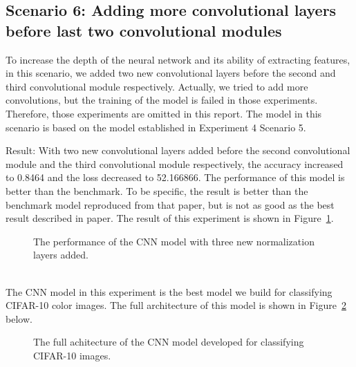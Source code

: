 \documentclass[]{UCD_CS_FYP_Report}
\begin{document}
\subsection{Scenario 6: Adding more convolutional layers before last two convolutional modules}
To increase the depth of the neural network and its ability of extracting features, in this scenario, we added two new convolutional layers before the second and third convolutional module respectively. Actually, we tried to add more convolutions, but the training of the model is failed in those experiments. Therefore, those experiments are omitted in this report. The model in this scenario is based on the model established in Experiment 4 Scenario 5.

Result: With two new convolutional layers added before the second convolutional module and the third convolutional module respectively, the accuracy increased to 0.8464 and the loss decreased to 52.166866. The performance of this model is better than the benchmark. To be specific, the result is better than the benchmark model reproduced from that paper, but is not as good as the best result described in paper. The result of this experiment is shown in Figure~\ref{fig:CIFAR_10_CNN_S6E1}.
\begin{figure}[h]
\centering
\fboxsep 2mm
\caption{\label{fig:CIFAR_10_CNN_S6E1} The performance of the CNN model with three new normalization layers added.}
\end{figure}
\\The CNN model in this experiment is the best model we build for classifying CIFAR-10 color images. The full architecture of this model is shown in Figure~\ref{fig:Full_Architecture_of_CNN} below.
\begin{figure}[h]
\centering
\fboxsep 2mm
\caption{\label{fig:Full_Architecture_of_CNN} The full achitecture of the CNN model developed for classifying CIFAR-10 images.}
\end{figure}
\end{document}
